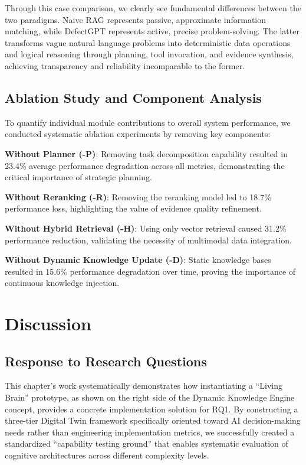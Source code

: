Through this case comparison, we clearly see fundamental differences between the two paradigms. Naive RAG represents passive, approximate information matching, while DefectGPT represents active, precise problem-solving. The latter transforms vague natural language problems into deterministic data operations and logical reasoning through planning, tool invocation, and evidence synthesis, achieving transparency and reliability incomparable to the former.

\subsection{Ablation Study and Component Analysis}

To quantify individual module contributions to overall system performance, we conducted systematic ablation experiments by removing key components:

\textbf{Without Planner (-P)}: Removing task decomposition capability resulted in 23.4\% average performance degradation across all metrics, demonstrating the critical importance of strategic planning.

\textbf{Without Reranking (-R)}: Removing the reranking model led to 18.7\% performance loss, highlighting the value of evidence quality refinement.

\textbf{Without Hybrid Retrieval (-H)}: Using only vector retrieval caused 31.2\% performance reduction, validating the necessity of multimodal data integration.

\textbf{Without Dynamic Knowledge Update (-D)}: Static knowledge bases resulted in 15.6\% performance degradation over time, proving the importance of continuous knowledge injection.

\section{Discussion}

\subsection{Response to Research Questions}

This chapter's work systematically demonstrates how instantiating a ``Living Brain'' prototype, as shown on the right side of the Dynamic Knowledge Engine concept, provides a concrete implementation solution for RQ1. By constructing a three-tier Digital Twin framework specifically oriented toward AI decision-making needs rather than engineering implementation metrics, we successfully created a standardized ``capability testing ground'' that enables systematic evaluation of cognitive architectures across different complexity levels.

